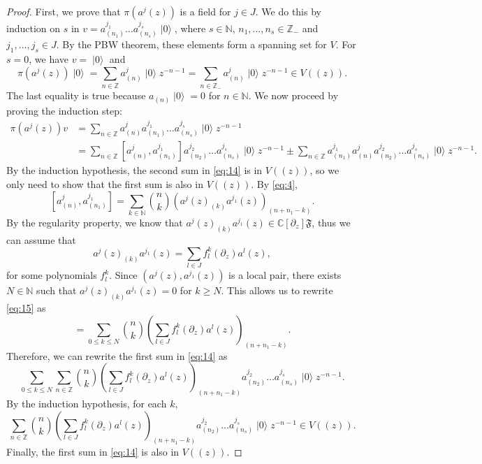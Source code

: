 \documentclass[a4paper, 12pt, reqno]{amsart}
\theoremstyle{remark}
\numberwithin{equation}{subsection}
\DeclareMathOperator{\vac}{|0\rangle}
\begin{document}
\begin{proof}
  First, we prove that $\pi(a^j(z))$ is a field for $j \in J$.
  We do this by induction on $s$ in $v = a^{j_1}_{(n_1)}\dots a^{j_s}_{(n_s)}\vac$, where $s \in \mathbb{N}$, $n_1, \dots, n_s \in \mathbb{Z}_-$ and $j_1, \dots, j_s \in J$.
  By the PBW theorem, these elements form a spanning set for $V$.
  For $s = 0$, we have $v = \vac$ and
  \begin{equation*}
    \pi(a^j(z))\vac = \sum_{n \in \mathbb{Z}}a^j_{(n)}\vac z^{-n - 1} = \sum_{n \in \mathbb{Z}_-}a^j_{(n)}\vac z^{-n - 1} \in V((z)).
  \end{equation*}
  The last equality is true because $a_{(n)}\vac = 0$ for $n \in \mathbb{N}$.
  We now proceed by proving the induction step:
  \begin{align}
    \nonumber
    \pi(a^j(z))v &= \sum_{n \in \mathbb{Z}}a^j_{(n)}a^{j_1}_{(n_1)}\dots a^{j_s}_{(n_s)}\vac z^{-n - 1} \\
    \label{eq:14}
    &= \sum_{n \in \mathbb{Z}} [a^j_{(n)}, a^{j_1}_{(n_1)}]a^{j_2}_{(n_2)}\dots a^{j_s}_{(n_s)}\vac z^{-n - 1} \pm \sum_{n \in \mathbb{Z}}a^{j_1}_{(n_1)}a^j_{(n)}a^{j_2}_{(n_2)}\dots a^{j_s}_{(n_s)}\vac z^{-n - 1}.
  \end{align}
  By the induction hypothesis, the second sum in \eqref{eq:14} is in $V((z))$, so we only need to show that the first sum is also in $V((z))$.
  By \eqref{eq:4},
  \begin{equation}
    \label{eq:15}
    [a^j_{(n)}, a^{j_1}_{(n_1)}] = \sum_{k \in \mathbb{N}}\binom{n}{k}(a^j(z)_{(k)}a^{j_1}(z))_{(n + n_1 - k)}.
  \end{equation}
  By the regularity property, we know that $a^j(z)_{(k)}a^{j_1}(z) \in \mathbb{C}[\partial_z]\mathfrak{F}$, thus we can assume that
  \begin{equation*}
    a^j(z)_{(k)}a^{j_1}(z) = \sum_{l \in J}f^k_l(\partial_z)a^l(z),
  \end{equation*}
  for some polynomials $f^k_l$.
  Since $(a^j(z), a^{j_1}(z))$ is a local pair, there exists $N \in \mathbb{N}$ such that $a^j(z)_{(k)}a^{j_1}(z) = 0$ for $k \ge N$.
  This allows us to rewrite \eqref{eq:15} as
  \begin{equation*}
    [a^j_{(n)}, a^{j_1}_{(n_1)}] = \sum_{0 \le k \le N}\binom{n}{k}\left(\sum_{l \in J}f^k_l(\partial_z)a^l(z)\right)_{(n + n_1 - k)}.
  \end{equation*}
  Therefore, we can rewrite the first sum in \eqref{eq:14} as
  \begin{equation*}
    \sum_{0 \le k \le N}\sum_{n \in \mathbb{Z}}\binom{n}{k}\left(\sum_{l \in J}f^k_l(\partial_z)a^l(z)\right)_{(n + n_1 - k)}a^{j_2}_{(n_2)}\dots a^{j_s}_{(n_s)}\vac z^{-n - 1}.
  \end{equation*}
  By the induction hypothesis, for each $k$,
  \begin{equation*}
    \sum_{n \in \mathbb{Z}}\binom{n}{k}\left(\sum_{l \in J}f^k_l(\partial_z)a^l(z)\right)_{(n + n_1 - k)}a^{j_2}_{(n_2)}\dots a^{j_s}_{(n_s)}\vac z^{-n - 1} \in V((z)).
  \end{equation*}
  Finally, the first sum in \eqref{eq:14} is also in $V((z))$.


\end{proof}
\end{document}
